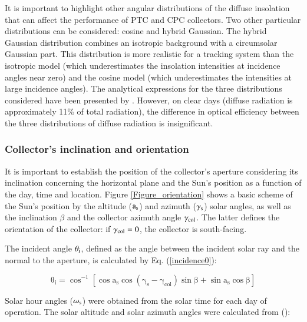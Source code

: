 It is important to highlight other angular distributions of the diffuse insolation that can affect the performance of PTC and CPC collectors. Two other particular distributions can be considered: cosine and hybrid Gaussian. The hybrid Gaussian distribution combines an isotropic background with a circumsolar Gaussian part. This distribution is more realistic for a tracking system than the isotropic model (which underestimates the insolation intensities at incidence angles near zero) and the cosine model (which underestimates the intensities at large incidence angles). The analytical expressions for the three distributions considered have been presented by \citet{Prapas1987}. However, on clear days (diffuse radiation is approximately 11\% of total radiation), the difference in optical efficiency between the three distributions of diffuse radiation is insignificant.

\subsubsection{Collector's inclination and orientation}

It is important to establish the position of the collector's aperture considering its inclination concerning the horizontal plane and the Sun's position as a function of the day, time and location. Figure \ref{Figure_orientation} shows a basic scheme of the Sun's position by the altitude ($\rm{a_s}$) and azimuth ($\rm{\gamma_s}$) solar angles, as well as the inclination $\beta$ and the collector azimuth angle $\rm{\gamma_{col}}$. The latter defines the orientation of the collector: if $\rm{\gamma_{col}} = 0$, the collector is south-facing.


The incident angle $\theta_{\rm{i}}$, defined as the angle between the incident solar ray and the normal to the aperture, is calculated by Eq. (\ref{incidence0}):

\begin{equation}
	\mathrm{\theta_i = {\cos ^{-1}}\left[ {\cos {a_s}\cos ({\gamma_s} - {\gamma_{col}})\sin \beta  + \sin {a_s}\cos \beta} \right]}
	\label{incidence0}
\end{equation}

Solar hour angles ($\omega_{\rm{s}}$) were obtained from the solar time for each day of operation. The solar altitude and solar azimuth angles were calculated from (\cite{Duffie2013}):

